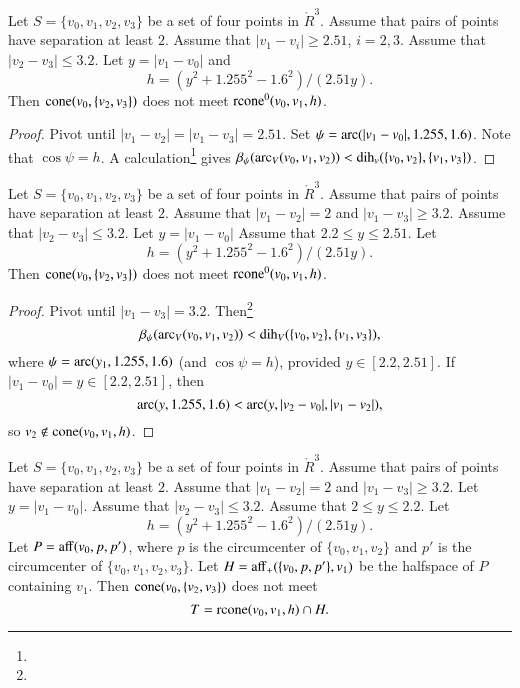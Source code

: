 \begin{lemma}
Let $S=\{v_0,v_1,v_2,v_3\}$ be a set of four points in $\ring{R}^3$.
Assume that pairs of points have separation at least $2$.
Assume that
$|v_1-v_i|\ge 2.51$, $i=2,3$.
Assume that $|v_2-v_3|\le 3.2$.
Let $y = |v_1-v_0|$ and 
$$
  h=(y^2+1.255^2-1.6^2)/(2.51 y).
$$
Then ${\operatorname{cone}}(v_0,\{v_2,v_3\})$ does not meet
${\operatorname{rcone}}^0(v_0,v_1,h)$.
\end{lemma}


\begin{proof}  Pivot until
$|v_1-v_2|=|v_1-v_3|=2.51$.   
Set
$\psi=\operatorname{arc}(|v_1-v_0|,1.255,1.6)$.  Note that $\cos\psi=h$.
A calculation\footnote{} %
gives $\beta_\psi(\operatorname{arc}_V(v_0,v_1,v_2))<\operatorname{dih}_v(\{v_0,v_2\},\{v_1,v_3\})$.
\end{proof}
\newpage

\begin{lemma} 
Let $S=\{v_0,v_1,v_2,v_3\}$ be a set of four points in $\ring{R}^3$.
Assume that pairs of points have separation at least $2$.
Assume that
$|v_1-v_2|=2$ and $|v_1-v_3|\ge3.2$.
Assume that $|v_2-v_3|\le 3.2$. Let $y = |v_1-v_0|$
Assume that $2.2\le y\le 2.51$.
Let
$$
  h= (y^2+1.255^2-1.6^2)/(2.51 y).
$$
Then ${\operatorname{cone}}(v_0,\{v_2,v_3\})$ does not meet
${\operatorname{rcone}}^0(v_0,v_1,h)$.
\end{lemma}


\begin{proof}
Pivot until
$|v_1-v_3|=3.2$. Then\footnote{} %
    $$\beta_\psi(\operatorname{arc}_V(v_0,v_1,v_2))< \operatorname{dih}_V(\{v_0,v_2\},\{v_1,v_3\}),$$
where $\psi=\operatorname{arc}(y_1,1.255,1.6)$ (and $\cos\psi=h$),
provided $y\in[2.2,2.51]$. If
$|v_1-v_0|=y\in[2.2,2.51]$, then
    $$\operatorname{arc}(y,1.255,1.6)<\operatorname{arc}(y,|v_2-v_0|,|v_1-v_2|),$$
so $v_2\not\in{\operatorname{cone}}(v_0,v_1,h)$.
\end{proof}


\newpage

\begin{lemma} 
Let $S=\{v_0,v_1,v_2,v_3\}$ be a set of four points in $\ring{R}^3$.
Assume that pairs of points have separation at least $2$.
Assume that
$|v_1-v_2|=2$ and $|v_1-v_3|\ge3.2$.
Let $y = |v_1-v_0|$.
Assume that $|v_2-v_3|\le 3.2$.
Assume that $2\le y\le 2.2$.
Let 
$$
  h=(y^2+1.255^2-1.6^2)/(2.51 y).
$$
Let $P={\operatorname{aff}}(v_0,p,p')$, where $p$ is the circumcenter
of $\{v_0,v_1,v_2\}$ and $p'$ is the circumcenter of $\{v_0,v_1,v_2,v_3\}$.  
Let $H = {\operatorname{aff}}_+(\{v_0,p,p'\},v_1)$ 
be the halfspace of $P$ containing
$v_1$. 
Then ${\operatorname{cone}}(v_0,\{v_2,v_3\})$ does not meet
$$
  T={\operatorname{rcone}}(v_0,v_1,h) \cap H.
$$
\end{lemma}


